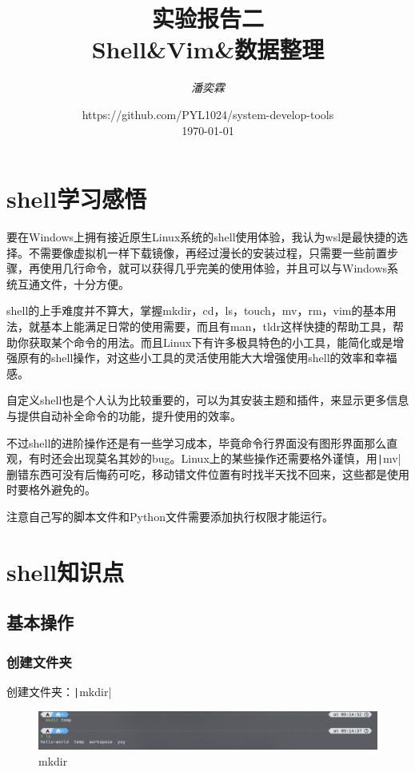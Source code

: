 \documentclass[fontset=ubuntu]{ctexart}
\title{\Huge \textbf{实验报告二 \\ Shell\&Vim\&数据整理}}
\author{\textit{潘奕霖}}
\date{https://github.com/PYL1024/system-develop-tools\\ \today}
\begin{document}
\begin{sloppypar}

\maketitle
\newpage

\tableofcontents
\newpage

\section{shell学习感悟}
要在Windows上拥有接近原生Linux系统的shell使用体验，我认为wsl是最快捷的选择。不需要像虚拟机一样下载镜像，再经过漫长的安装过程，只需要一些前置步骤，再使用几行命令，就可以获得几乎完美的使用体验，并且可以与Windows系统互通文件，十分方便。

shell的上手难度并不算大，掌握mkdir，cd，ls，touch，mv，rm，vim的基本用法，就基本上能满足日常的使用需要，而且有man，tldr这样快捷的帮助工具，帮助你获取某个命令的用法。而且Linux下有许多极具特色的小工具，能简化或是增强原有的shell操作，对这些小工具的灵活使用能大大增强使用shell的效率和幸福感。

自定义shell也是个人认为比较重要的，可以为其安装主题和插件，来显示更多信息与提供自动补全命令的功能，提升使用的效率。

不过shell的进阶操作还是有一些学习成本，毕竟命令行界面没有图形界面那么直观，有时还会出现莫名其妙的bug。Linux上的某些操作还需要格外谨慎，用\texttt|mv|删错东西可没有后悔药可吃，移动错文件位置有时找半天找不回来，这些都是使用时要格外避免的。

注意自己写的脚本文件和Python文件需要添加执行权限才能运行。

\section{shell知识点}
\subsection{基本操作}
\subsubsection{创建文件夹}
创建文件夹：\texttt|mkdir|
\begin{figure}[htb]
    \centering
    \includegraphics[width=0.75\linewidth]{mkdir_1.png}
    \caption{mkdir}
    \label{fig:mkdir_1}
\end{figure}


\end{sloppypar}
\end{document}
